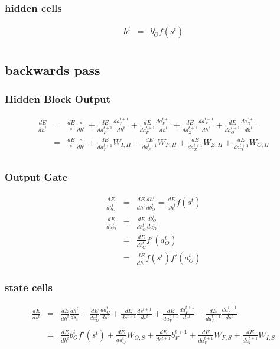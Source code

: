 \documentclass{article}
\begin{document}
\subsubsection{hidden cells}
\begin{eqnarray*}
h^t &=& b_{O}^t f(s^t) \\
\end{eqnarray*}


\subsection{backwards pass}

\subsubsection{Hidden Block Output}
\begin{eqnarray*}
\frac{dE}{dh^t} &=& \frac{dE}{ \circ }\frac{ \circ }{dh^t} + \frac{dE}{da_{I}^{t+1}}\frac{da_{I}^{t+1}}{dh^t} + \frac{dE}{da_{F}^{t+1}}\frac{da_{F}^{t+1}}{dh^{t}} + \frac{dE}{da_{Z}^{t+1}}\frac{da_{Z}^{t+1}}{dh^t} + \frac{dE}{da_{O}^{t+1}}\frac{da_{O}^{t+1}}{dh^t} \\
 &=& \frac{dE}{\circ}\frac{\circ}{dh^t} + \frac{dE}{da_{I}^{t+1}}W_{I,H} + \frac{dE}{da_{F}^{t+1}}W_{F,H} + \frac{dE}{da_{Z}^{t+1}}W_{Z,H} + \frac{dE}{da_{O}^{t+1}}W_{O,H} \\
\end{eqnarray*}

\subsubsection{Output Gate}
\begin{eqnarray*}
\frac{dE}{db_{O}^t} &=& \frac{dE}{dh^t}\frac{dh^t}{db_{O}^t} = \frac{dE}{dh^t}f(s^t) \\ 
\frac{dE}{da_{O}^t} &=& \frac{dE}{db_{O}^t}\frac{db_{O}^t}{da_{O}^t} \\
&=& \frac{dE}{db_{O}^t}f'(a_{O}^t) \\
&=& \frac{dE}{dh^t}f(s^t)f'(a_{O}^t) 
\end{eqnarray*}

\subsubsection{state cells}
\begin{eqnarray*}
\frac{dE}{ds^t}&=&\frac{dE}{dh^t}\frac{dh^t}{ds_t} + \frac{dE}{da_{O}^t}\frac{da_{O}^t}{ds^t}+\frac{dE}{ds^{t+1}}\frac{ds^{t+1}}{ds^t}+\frac{dE}{da_{F}^{t+1}}\frac{da_{F}^{t+1}}{ds^t} + \frac{dE}{da_{I}^{t+1}}\frac{da_{I}^{t+1}}{ds^t}\\ \\
&=& \frac{dE}{dh^t}b_{O}^tf'(s^t)+ \frac{dE}{da_{O}^t}W_{O,S} + \frac{dE}{ds^{t+1}}b_{F}^{t+1} + \frac{dE}{da_{F}^{t+1}}W_{F,S} + \frac{dE}{da_{I}^{t+1}}W_{I,S} \\
\end{eqnarray*}
\end{document}
